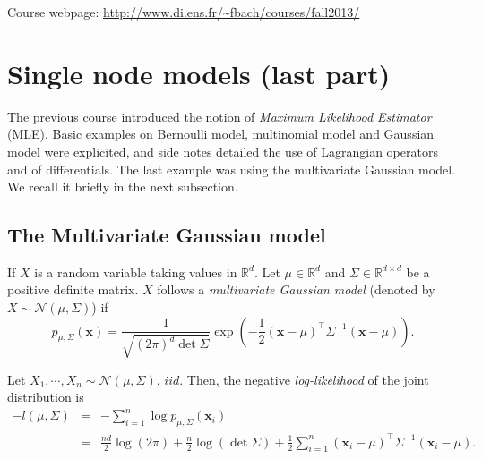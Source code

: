 \documentclass[12pt]{report}	%
\def\ts{\top}
\def\xb{\mathbf{x}}
\begin{document}
	 

	
\maketitle

\BIT
\item
Course webpage: 
\url{http://www.di.ens.fr/~fbach/courses/fall2013/}
\EIT

\section{Single node models (last part)}


The previous course introduced the notion of \emph{Maximum Likelihood Estimator} (MLE). Basic examples on Bernoulli model, multinomial model and Gaussian model were explicited, and side notes detailed the use of Lagrangian operators and of differentials. The last example was using the multivariate Gaussian model. We recall it briefly in the next subsection.

\subsection{The Multivariate Gaussian model}

If $X$ is a random variable taking values in $\mathbb{R}^{d}$. Let $\mu\in\mathbb{R}^{d}$ and $\Sigma\in\mathbb{R}^{d\times d}$ be a positive definite matrix. $X$ follows a \emph{multivariate Gaussian model} (denoted by $X\sim\mathcal{N}\left(\mu,\Sigma\right)$) if
\[
p_{\mu,\Sigma}\left(\xb\right)=\frac{1}{\sqrt{\left(2\pi\right)^{d}\det\Sigma}}\exp\left(-\frac{1}{2}\left(\xb-\mu\right)^{\ts}\Sigma^{-1}\left(\xb-\mu\right)\right).
\]

Let $X_{1},\cdots,X_{n}\sim\mathcal{N}\left(\mu,\Sigma\right)$, $iid$. Then, the negative \emph{log-likelihood} of the joint distribution is
\begin{eqnarray*}
-l\left(\mu,\Sigma\right) & = & -\sum_{i=1}^{n}\log p_{\mu,\Sigma}\left(\xb_{i}\right)\\
 & = & \frac{nd}{2}\log\left(2\pi\right)+\frac{n}{2}\log\left(\det\Sigma\right)+\frac{1}{2}\sum_{i=1}^{n}\left(\xb_{i}-\mu\right)^{\ts}\Sigma^{-1}\left(\xb_{i}-\mu\right).
 \end{eqnarray*}
\end{document}
